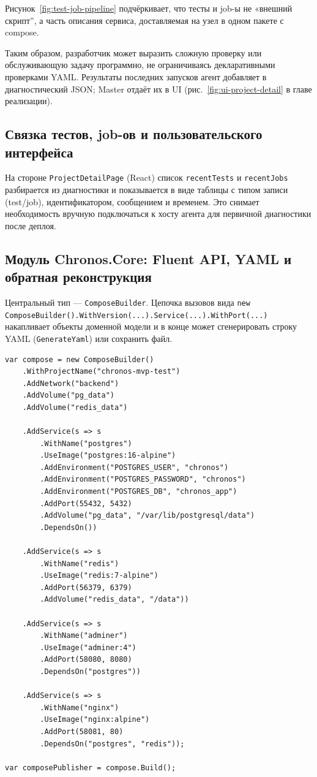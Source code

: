 Рисунок~\ref{fig:test-job-pipeline} подчёркивает, что тесты и job-ы не «внешний скрипт'', а часть описания сервиса, доставляемая на узел в одном пакете с compose.

Таким образом, разработчик может выразить сложную проверку или обслуживающую задачу программно, не ограничиваясь декларативными проверками YAML. Результаты последних запусков агент добавляет в диагностический JSON; Master отдаёт их в UI (рис.~\ref{fig:ui-project-detail} в главе реализации).

\subsection{Связка тестов, job-ов и пользовательского интерфейса}

На стороне \texttt{ProjectDetailPage} (React) список \texttt{recentTests} и \texttt{recentJobs} разбирается из диагностики и показывается в виде таблицы с типом записи (test/job), идентификатором, сообщением и временем. Это снимает необходимость вручную подключаться к хосту агента для первичной диагностики после деплоя.

\subsection{Модуль Chronos.Core: Fluent API, YAML и обратная реконструкция}

Центральный тип --- \texttt{ComposeBuilder}. Цепочка вызовов вида \texttt{new ComposeBuilder().WithVersion(...).Service(...).WithPort(...)} накапливает объекты доменной модели и в конце может сгенерировать строку YAML (\texttt{GenerateYaml}) или сохранить файл.

\begin{lstlisting}[style=code,caption={Пример сборки compose-проекта через Fluent API \texttt{ComposeBuilder}}]
var compose = new ComposeBuilder()
    .WithProjectName("chronos-mvp-test")
    .AddNetwork("backend")
    .AddVolume("pg_data")
    .AddVolume("redis_data")

    .AddService(s => s
        .WithName("postgres")
        .UseImage("postgres:16-alpine")
        .AddEnvironment("POSTGRES_USER", "chronos")
        .AddEnvironment("POSTGRES_PASSWORD", "chronos")
        .AddEnvironment("POSTGRES_DB", "chronos_app")
        .AddPort(55432, 5432)
        .AddVolume("pg_data", "/var/lib/postgresql/data")
        .DependsOn())

    .AddService(s => s
        .WithName("redis")
        .UseImage("redis:7-alpine")
        .AddPort(56379, 6379)
        .AddVolume("redis_data", "/data"))

    .AddService(s => s
        .WithName("adminer")
        .UseImage("adminer:4")
        .AddPort(58080, 8080)
        .DependsOn("postgres"))

    .AddService(s => s
        .WithName("nginx")
        .UseImage("nginx:alpine")
        .AddPort(58081, 80)
        .DependsOn("postgres", "redis"));

var composePublisher = compose.Build();
\end{lstlisting}

